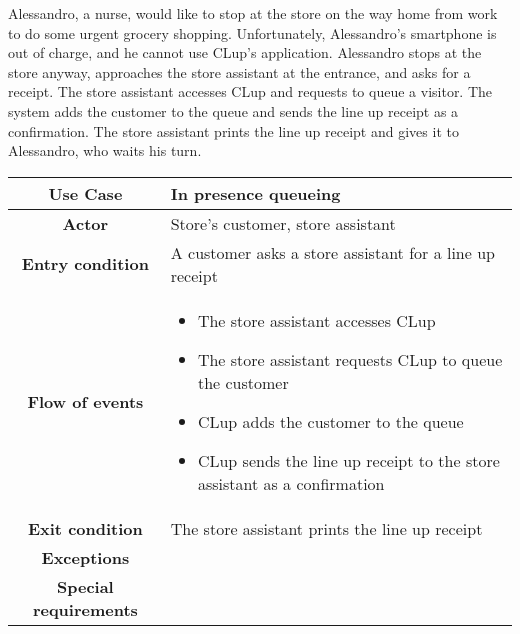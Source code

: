 \documentclass[../../main.tex]{subfiles}
\begin{document}
    Alessandro, a nurse, would like to stop at the store on the way home from work to do some urgent grocery shopping. 
    Unfortunately, Alessandro's smartphone is out of charge, and he cannot use CLup's application. 
    Alessandro stops at the store anyway, approaches the store assistant at the entrance, and asks for a receipt. 
    The store assistant accesses CLup and requests to queue a visitor. The system adds the customer to the queue and sends the line up receipt as a confirmation. 
    The store assistant prints the line up receipt and gives it to Alessandro, who waits his turn.

    \begin{table}[H]
      \centering
        \begin{tabular}{c m{}}
        \hline
        \textbf{Use Case} & In presence queueing\\ \hline
        \textbf{Actor} & Store's customer, store assistant\\ \hline
        \textbf{Entry condition} & A customer asks a store assistant for a line up receipt\\  \hline
        \textbf{Flow of events} & \begin{itemize}
                                    \item The store assistant accesses CLup
                                    \item The store assistant requests CLup to queue the customer
                                    \item CLup adds the customer to the queue
                                    \item CLup sends the line up receipt to the store assistant as a confirmation
                                  \end{itemize}\\ \hline
        \textbf{Exit condition} & The store assistant prints the line up receipt \\ \hline
        \textbf{Exceptions} & \\ \hline
        \textbf{Special requirements} &\\ \hline
        \end{tabular}
    \end{table}
\end{document}
